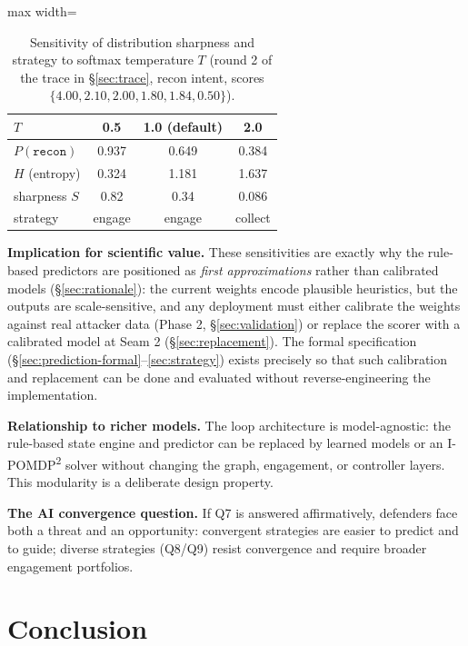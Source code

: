 \documentclass[11pt]{article}
\newcommand{\act}[1]{\texttt{#1}}
\begin{document}
\begin{table}[ht]
\centering
\begin{adjustbox}{max width=\linewidth}\begin{tabular}{@{}lccc@{}}
\toprule
$T$ & 0.5 & 1.0 (default) & 2.0 \\
\midrule
$P(\act{recon})$ & 0.937 & 0.649 & 0.384 \\
$H$ (entropy) & 0.324 & 1.181 & 1.637 \\
sharpness $S$ & 0.82 & 0.34 & 0.086 \\
strategy & engage & engage & collect \\
\bottomrule
\end{tabular}\end{adjustbox}
\caption{Sensitivity of distribution sharpness and strategy to softmax
temperature $T$ (round 2 of the trace in \S\ref{sec:trace}, recon intent,
scores $\{4.00, 2.10, 2.00, 1.80, 1.84, 0.50\}$).}
\label{tab:sens-temp}
\end{table}

\textbf{Implication for scientific value.} These sensitivities are exactly
why the rule-based predictors are positioned as \textit{first
approximations} rather than calibrated models (\S\ref{sec:rationale}): the
current weights encode plausible heuristics, but the outputs are
scale-sensitive, and any deployment must either calibrate the weights
against real attacker data (Phase 2, \S\ref{sec:validation}) or replace the
scorer with a calibrated model at Seam 2 (\S\ref{sec:replacement}). The
formal specification (\S\ref{sec:prediction-formal}--\ref{sec:strategy})
exists precisely so that such calibration and replacement can be done and
evaluated without reverse-engineering the implementation.

\textbf{Relationship to richer models.} The loop architecture is
model-agnostic: the rule-based state engine and predictor can be replaced by
learned models or an I-POMDP\textsuperscript{2} solver without changing the
graph, engagement, or controller layers. This modularity is a deliberate
design property.

\textbf{The AI convergence question.} If Q7 is answered affirmatively,
defenders face both a threat and an opportunity: convergent strategies are
easier to predict and to guide; diverse strategies (Q8/Q9) resist
convergence and require broader engagement portfolios.

\section{Conclusion}
\label{sec:conclusion}
\end{document}

